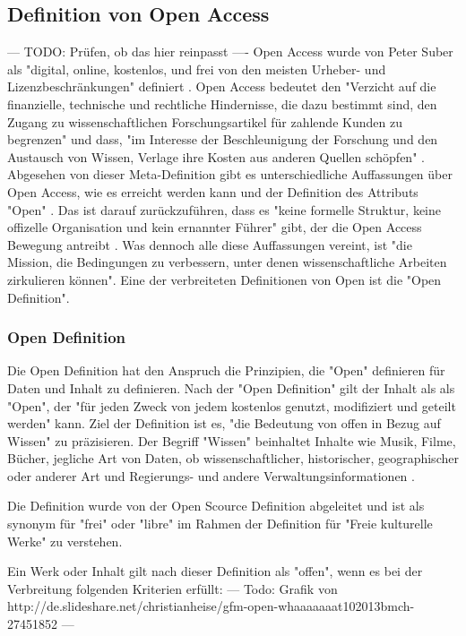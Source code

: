 \subsection{Definition von Open Access}
--- TODO: Prüfen, ob das hier reinpasst ----
Open Access wurde von Peter Suber als "digital, online, kostenlos, und frei von den meisten Urheber- und Lizenzbeschränkungen" \cite{suber_2012_open} definiert \cite{Adema_2014_open_access}. Open Access bedeutet den "Verzicht auf die finanzielle, technische und rechtliche Hindernisse, die dazu bestimmt sind, den Zugang zu wissenschaftlichen Forschungsartikel für zahlende Kunden zu begrenzen" und dass, "im Interesse der Beschleunigung der Forschung und den Austausch von Wissen, Verlage ihre Kosten aus anderen Quellen schöpfen" \cite{Suber_2002}. Abgesehen von dieser Meta-Definition gibt es unterschiedliche Auffassungen über Open Access, wie es erreicht werden kann und der Definition des Attributs "Open" \cite{Adema_2014_open_access}. Das ist darauf zurückzuführen, dass es "keine formelle Struktur, keine offizelle Organisation und kein ernannter Führer" gibt, der die Open Access Bewegung antreibt \cite{poynder_2011_suber}. Was dennoch alle diese Auffassungen vereint, ist "die Mission, die Bedingungen zu verbessern, unter denen wissenschaftliche Arbeiten zirkulieren können"\cite{Adema_2014_open_access}. Eine der verbreiteten Definitionen von Open ist die "Open Definition".

\subsubsection{Open Definition}

Die Open Definition hat den Anspruch die Prinzipien, die "Open" definieren für Daten und Inhalt zu definieren. Nach der "Open Definition" gilt der Inhalt als als "Open", der "für jeden Zweck von jedem kostenlos genutzt, modifiziert und geteilt werden" \cite{open_definition} kann. Ziel der Definition ist es, "die Bedeutung von offen in Bezug auf Wissen" zu präzisieren. Der Begriff "Wissen" beinhaltet Inhalte wie Musik, Filme, Bücher, jegliche Art von Daten, ob wissenschaftlicher, historischer, geographischer oder anderer Art und Regierungs- und andere Verwaltungsinformationen \cite{open_definition}.

Die Definition wurde von der Open Scource Definition abgeleitet und ist als synonym für "frei" oder "libre" im Rahmen der Definition für "Freie kulturelle Werke" zu verstehen.

Ein Werk oder Inhalt gilt nach dieser Definition als "offen", wenn es bei der Verbreitung folgenden Kriterien erfüllt:
--- Todo: Grafik von http://de.slideshare.net/christianheise/gfm-open-whaaaaaaat102013bmch-27451852 ---

